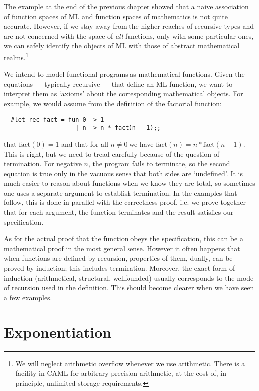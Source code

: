 The example at the end of the previous chapter showed that a naive association
of function spaces of ML and function spaces of mathematics is not quite
accurate. However, if we stay away from the higher reaches of recursive types
and are not concerned with the space of {\em all} functions, only with some
particular ones, we can safely identify the objects of ML with those of
abstract mathematical realms.\footnote{We will neglect arithmetic overflow
whenever we use arithmetic. There is a facility in CAML for arbitrary precision
arithmetic, at the cost of, in principle, unlimited storage requirements.}

We intend to model functional programs as mathematical functions. Given the
equations --- typically recursive --- that define an ML function, we want to
interpret them as `axioms' about the corresponding mathematical objects. For
example, we would assume from the definition of the factorial function:

\begin{boxed}\begin{verbatim}
  #let rec fact = fun 0 -> 1
                    | n -> n * fact(n - 1);;
\end{verbatim}\end{boxed}

\noindent that $\mbox{fact}(0) = 1$ and that for all $n \not= 0$ we have
$\mbox{fact}(n) = n * \mbox{fact}(n - 1)$. This is right, but we need to tread
carefully because of the question of termination. For negative $n$, the program
fails to terminate, so the second equation is true only in the vacuous sense
that both sides are `undefined'. It is much easier to reason about functions
when we know they are total, so sometimes one uses a separate argument to
establish termination. In the examples that follow, this is done in parallel
with the correctness proof, i.e. we prove together that for each argument, the
function terminates and the result satisfies our specification.

As for the actual proof that the function obeys the specification, this can be
a mathematical proof in the most general sense. However it often happens that
when functions are defined by recursion, properties of them, dually, can be
proved by induction; this includes termination. Moreover, the exact form of
induction (arithmetical, structural, wellfounded) usually corresponds to the
mode of recursion used in the definition. This should become clearer when we
have seen a few examples.

\section{Exponentiation}

